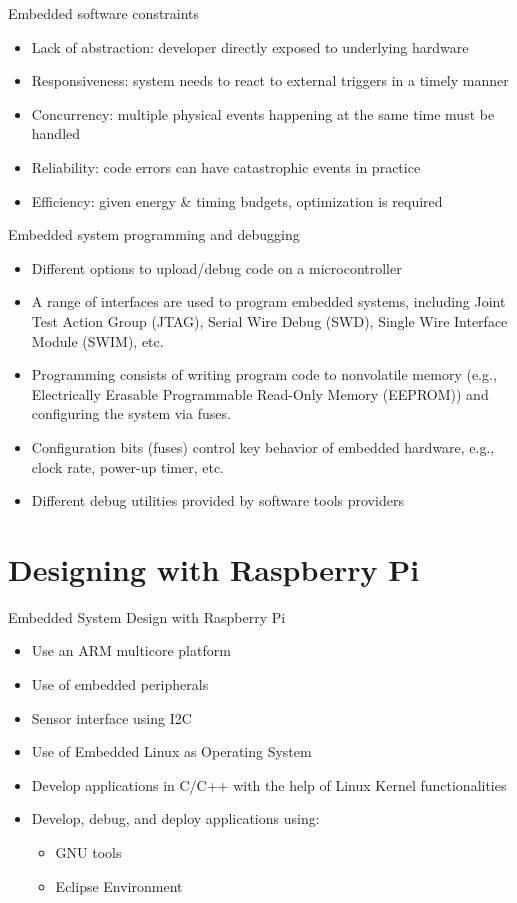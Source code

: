 \begin{frame}{Embedded software constraints}
\begin{itemize}
    \item Lack of abstraction: developer directly exposed to underlying hardware
    \item Responsiveness: system needs to react to external triggers in a timely manner
    \item Concurrency: multiple physical events happening at the same time must be handled
    \item Reliability: code errors can have catastrophic events in practice
    \item Efficiency: given energy \& timing budgets, optimization is required
\end{itemize}
\end{frame}

\begin{frame}{Embedded system programming and debugging}
\begin{itemize}
    \item Different options to upload/debug code on a microcontroller
    \item A range of interfaces are used to program embedded systems, including Joint Test Action Group (JTAG), Serial Wire Debug (SWD), Single Wire Interface Module (SWIM), etc.
    \item Programming consists of writing program code to nonvolatile memory (e.g., Electrically Erasable Programmable Read-Only Memory (EEPROM)) and configuring the system via fuses.
    \item Configuration bits (fuses) control key behavior of embedded hardware, e.g., clock rate, power-up timer, etc.
    \item Different debug utilities provided by software tools providers
\end{itemize}
\end{frame}

\section{Designing with Raspberry Pi}
\begin{frame}{Embedded System Design with Raspberry Pi}
  \begin{itemize}
    \item Use an ARM multicore platform
    \item Use of embedded peripherals
    \item Sensor interface using I2C
    \item Use of Embedded Linux as Operating System
    \item Develop applications in C/C++ with the help of Linux Kernel functionalities
    \item Develop, debug, and deploy applications using:
    \begin{itemize}
        \item GNU tools
        \item Eclipse Environment
    \end{itemize}
\end{itemize}
\end{frame}

